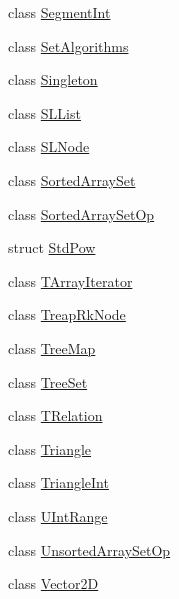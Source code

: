 \begin{DoxyCompactItemize}
\item 
class \hyperlink{class_designar_1_1_segment_int}{Segment\+Int}
\item 
class \hyperlink{class_designar_1_1_set_algorithms}{Set\+Algorithms}
\item 
class \hyperlink{class_designar_1_1_singleton}{Singleton}
\item 
class \hyperlink{class_designar_1_1_s_l_list}{S\+L\+List}
\item 
class \hyperlink{class_designar_1_1_s_l_node}{S\+L\+Node}
\item 
class \hyperlink{class_designar_1_1_sorted_array_set}{Sorted\+Array\+Set}
\item 
class \hyperlink{class_designar_1_1_sorted_array_set_op}{Sorted\+Array\+Set\+Op}
\item 
struct \hyperlink{struct_designar_1_1_std_pow}{Std\+Pow}
\item 
class \hyperlink{class_designar_1_1_t_array_iterator}{T\+Array\+Iterator}
\item 
class \hyperlink{class_designar_1_1_treap_rk_node}{Treap\+Rk\+Node}
\item 
class \hyperlink{class_designar_1_1_tree_map}{Tree\+Map}
\item 
class \hyperlink{class_designar_1_1_tree_set}{Tree\+Set}
\item 
class \hyperlink{class_designar_1_1_t_relation}{T\+Relation}
\item 
class \hyperlink{class_designar_1_1_triangle}{Triangle}
\item 
class \hyperlink{class_designar_1_1_triangle_int}{Triangle\+Int}
\item 
class \hyperlink{class_designar_1_1_u_int_range}{U\+Int\+Range}
\item 
class \hyperlink{class_designar_1_1_unsorted_array_set_op}{Unsorted\+Array\+Set\+Op}
\item 
class \hyperlink{class_designar_1_1_vector2_d}{Vector2D}
\end{DoxyCompactItemize}
